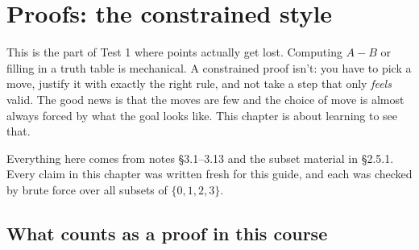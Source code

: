 \section{Proofs: the constrained style}
\label{sec:proofs}

\newcommand{\prfgap}{0.5cm}
\newcommand{\prfstart}{\node[inner sep=0pt,minimum size=0pt] (p0) at (0,0) {};}
\newcommand{\prfline}[6]{%
  \node[anchor=north west,inner sep=2pt,font=\small,align=flush left,
        text width=\dimexpr 10.9cm-#3\dimexpr\prfgap\relax\relax]
    (#1t) at ($(0,0 |- #2.south)+(0.7cm+#3*\prfgap,-1.2pt)$) {#5};
  \node[anchor=north east,inner sep=2pt,font=\small,align=flush right,text width=4.3cm]
    (#1r) at ($(0,0 |- #1t.north)+(16.3cm,0)$) {#6};
  \node[anchor=north west,inner sep=2pt,font=\small] at (0,0 |- #1t.north) {#4};
  \node[fit=(#1t)(#1r),inner sep=0pt] (#1) {};}
\newcommand{\prfscope}[4]{%
  \draw ($(0,0 |- #1.north)+(0.7cm+#3*\prfgap-0.16cm,-1.2pt)$)
     -- ($(0,0 |- #2.south)+(0.7cm+#3*\prfgap-0.16cm,1.2pt)$);
  \draw ($(0,0 |- #1t.south)+(0.7cm+#3*\prfgap-0.16cm,0)$) -- ++(#4,0);}
\newcommand{\prfqed}{\ $\mdlgwhtsquare$}

This is the part of Test 1 where points actually get lost. Computing $A-B$ or filling in a truth table is mechanical. A constrained proof isn't: you have to pick a move, justify it with exactly the right rule, and not take a step that only \emph{feels} valid. The good news is that the moves are few and the choice of move is almost always forced by what the goal looks like. This chapter is about learning to see that.

Everything here comes from notes \S3.1--3.13 and the subset material in \S2.5.1. Every claim in this chapter was written fresh for this guide, and each was checked by brute force over all subsets of $\{0,1,2,3\}$.

\subsection{What counts as a proof in this course}

